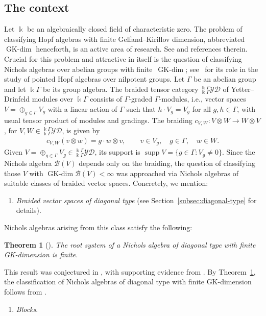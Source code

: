 \documentclass[pdftex]{sigma}
\numberwithin{equation}{section}
\newtheorem{Theorem}{Theorem}[section]
\newcommand{\GK}{\operatorname{GK-dim}}
\newcommand{\supp}{\operatorname{supp}}
\newcommand{\toba}{\mathscr B}
\newcommand{\yd}[1]{{}_{#1}^{#1}\mathcal{YD}}
\begin{document}
\subsection{The context}
Let $\Bbbk$ be an algebraically closed field of characteristic zero.
The problem of classifying Hopf algebras with finite Gelfand--Kirillov dimension, abbreviated $\GK$ henceforth,
is an active area of research. See \cite{AAH-triang,ASa-preNichols,angiono-campagnolo-sanmarco,brown-zhang}
and references therein.
Crucial for this problem and attractive in itself is the question of classifying Nichols algebras over abelian groups with finite~$\GK$; see~\cite{A-nilpotent} for its role in the study of pointed Hopf algebras over nilpotent groups.
Let $\Gamma$ be an abelian group and let $\Bbbk \Gamma$ be its group algebra.
The braided tensor category $\yd{\Bbbk\Gamma}$ of Yetter--Drinfeld modules over $\Bbbk \Gamma$
consists of $\Gamma$-graded $\Gamma$-modules, i.e., vector spaces $V = \oplus_{g \in \Gamma} V_g$
with a linear action of $\Gamma$ such that $h \cdot V_g = V_g$ for all $g,h\in \Gamma$, with usual tensor product of modules and gradings.
The braiding $c_{V,W}\colon V \otimes W \to W \otimes V$, for $V, W\in \yd{\Bbbk\Gamma}$, is given by
\begin{gather}\label{eq:braiding-ydG}
c_{V,W} (v \otimes w) = g\cdot w \otimes v, \qquad
v\in V_g, \quad g \in \Gamma, \quad w\in W.
\end{gather}
Given $V = \oplus_{g \in \Gamma} V_g \in\yd{\Bbbk\Gamma}$, its support is
$\supp V = \{g\in \Gamma\colon V_g \neq 0 \}$.
Since the Nichols algebra $\toba(V)$ depends only on the braiding, the question of classifying those $V$ with $\GK \toba(V) < \infty$
was approached via Nichols algebras of suitable classes of braided vector spaces. Concretely, we mention:
\begin{enumerate}[label=$(\alph*)$]\itemsep=0pt
\item\label{item:diagonal}
\emph{Braided vector spaces of diagonal type} (see Section~\ref{subsec:diagonal-type} for details).
\end{enumerate}
Nichols algebras arising from this class satisfy the following:

\begin{Theorem}[\cite{angiono-garcia2}]\label{thm:conj-AAH} The root system
of a Nichols algebra of diagonal type with finite GK-dimension is finite.
\end{Theorem}

This result was conjectured in \cite[Conjecture 1.3.3]{AAH-triang}, with supporting evidence from \cite{AA,AAH-diag,angiono-garcia, R-quantum-groups}.
By Theorem~\ref{thm:conj-AAH}, the classification of Nichols algebras of diagonal type with finite GK-dimension
follows from \cite{H-classif-RS}.
\begin{enumerate}[label=$(\alph*)$,resume]\itemsep=0pt
\item\label{item:blocks}
\emph{Blocks}.
\end{enumerate}
\end{document}
